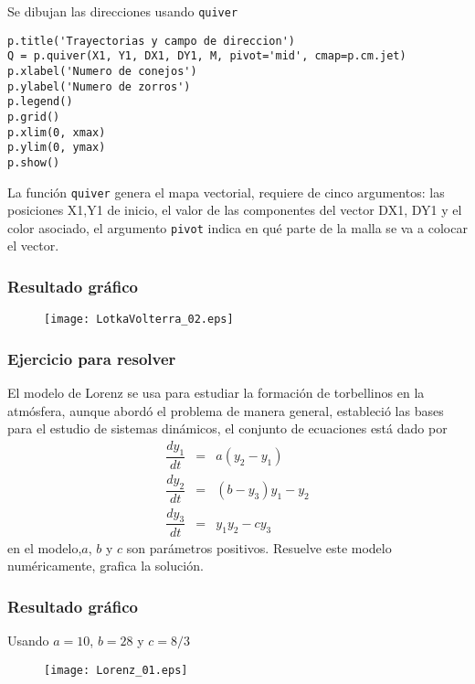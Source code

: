 \begin{frame}[fragile]
Se dibujan las direcciones usando \texttt{quiver}
\begin{lstlisting}
p.title('Trayectorias y campo de direccion')
Q = p.quiver(X1, Y1, DX1, DY1, M, pivot='mid', cmap=p.cm.jet)
p.xlabel('Numero de conejos')
p.ylabel('Numero de zorros')
p.legend()
p.grid()
p.xlim(0, xmax)
p.ylim(0, ymax)
p.show()
\end{lstlisting}
La funci\'{o}n \texttt{quiver} genera el mapa vectorial, requiere de cinco argumentos: las posiciones X1,Y1 de inicio, el valor de las componentes del vector DX1, DY1 y el color asociado, el argumento \texttt{pivot} indica en qu\'{e} parte de la malla se va a colocar el vector.
\end{frame}
\begin{frame}
\frametitle{Resultado gr\'{a}fico}
\begin{figure}
	\centering
	\texttt{[image: LotkaVolterra\_02.eps]} 
\end{figure}
\end{frame}
\begin{frame}
\frametitle{Ejercicio para resolver}
El modelo de Lorenz se usa para estudiar la formaci\'{o}n de torbellinos en la atm\'{o}sfera, aunque abord\'{o} el problema de manera general, estableci\'{o} las bases para el estudio de sistemas din\'{a}micos, el conjunto de ecuaciones est\'{a} dado por
\begin{eqnarray*}
\dfrac{dy_{1}}{dt} &=& a(y_{2}-y_{1}) \\
\dfrac{dy_{2}}{dt} &=& (b - y_{3})y_{1} - y_{2} \\
\dfrac{dy_{3}}{dt} &=& y_{1}y_{2} - cy_{3}
\end{eqnarray*}
en el modelo,$a$, $b$ y $c$ son par\'{a}metros positivos. Resuelve este modelo num\'{e}ricamente, grafica la soluci\'{o}n.
\end{frame}
\begin{frame}
\frametitle{Resultado gr\'{a}fico}
Usando $a = 10$, $b= 28$ y $c=8/3$
\begin{figure}
	\centering
	\texttt{[image: Lorenz\_01.eps]} 
\end{figure}
\end{frame}
